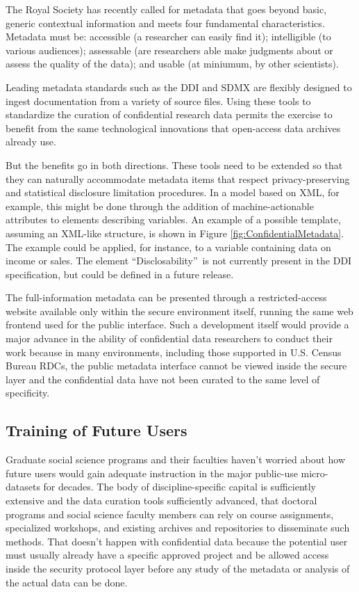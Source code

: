 The Royal Society \cite{RoyalSociety2012} has recently called for metadata that goes beyond basic, generic contextual information and meets four fundamental characteristics.  Metadata must be:  accessible (a researcher can easily find it); intelligible (to various audiences); assessable (are researchers able make judgments about or assess the quality of the data); and usable (at miniumum, by other scientists). 

Leading metadata standards such as the \ac{DDI} and \ac{SDMX} are flexibly
designed to ingest documentation from a variety of source files. Using these
tools to standardize the curation of confidential research data permits the
exercise to benefit from the same technological innovations that open-access
data archives already use. \cite{GregoryHeus2007,BlankRasmussen2004}   %

But the benefits go in both directions. These tools need to be extended so
that they can naturally accommodate metadata items that respect
privacy-preserving and statistical disclosure limitation procedures. In a
model based on \ac{XML}, for example, this might be done through the
addition of machine-actionable attributes to elements describing variables.
An example of a possible template, assuming an \ac{XML}-like structure, is
shown in Figure \ref{fig:ConfidentialMetadata}. The example could be
applied, for instance, to a variable containing data on income or sales. The
element \textquotedblleft Disclosability\textquotedblright\ is not currently
present in the \ac{DDI} specification, but could be defined in a future
release.

The full-information metadata can be presented through a restricted-access
website available only within the secure environment itself, running the
same web frontend used for the public interface. Such a development itself
would provide a major advance in the ability of confidential data
researchers to conduct their work because in many environments, including
those supported in U.S. Census Bureau RDCs, the public metadata interface
cannot be viewed inside the secure layer and the confidential data have not
been curated to the same level of specificity.

\subsection{Training of Future Users}

Graduate social science programs and their faculties haven't worried about
how future users would gain adequate instruction in the major public-use
micro-datasets for decades. The body of discipline-specific capital is
sufficiently extensive and the data curation tools sufficiently advanced,
that doctoral programs and social science faculty members can rely on course
assignments, specialized workshops, and existing archives and repositories
to disseminate such methods. That doesn't happen with confidential data
because the potential user must usually already have a specific approved
project and be allowed access inside the security protocol layer before any
study of the metadata or analysis of the actual data can be done.

